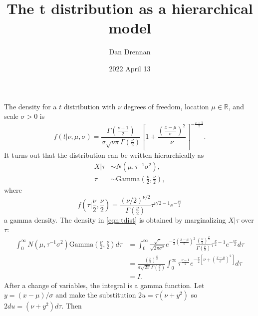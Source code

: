 \documentclass[11pt, letterpaper]{article}
\title{The t distribution as a hierarchical model}
\author{Dan Drennan}
\date{2022 April 13}
\begin{document}
    
\maketitle

The density for a $t$ distribution with $\nu$ degrees of freedom,
location $\mu \in \mathbb{R}$, and scale $\sigma > 0$ is
\begin{equation}
    f(t | \nu, \mu, \sigma) =
    \frac{\Gamma(\frac{\nu + 1}{2})}{\sigma\sqrt{\nu\pi}\Gamma(\frac{\nu}{2})}\left[
        1 + \frac{\left(\frac{x - \mu}{\sigma}\right)^2}{\nu}
    \right]^{-\frac{\nu + 1}{2}}.
    \label{eqn:tdist}
\end{equation}
It turns out that the distribution can be written hierarchically as
\begin{align*}
    X | \tau &\sim N(\mu, \tau^{-1}\sigma^2), \\
    \tau &\sim \text{Gamma}\left(\frac{\nu}{2}, \frac{\nu}{2}\right),
\end{align*}
where
$$
    f(\tau | \frac{\nu}{2}, \frac{\nu}{2}) = 
    \frac{(\nu/2)^{\nu/2}}{\Gamma(\frac{\nu}{2})} \tau^{\nu/2 - 1} e^{-\frac{\nu\tau}{2}}
$$
a gamma density. The density in \eqref{eqn:tdist} is obtained by marginalizing 
$X | \tau$ over $\tau$:
\begin{align*}
    \int_{0}^{\infty} N(\mu, \tau^{-1}\sigma^2) \text{Gamma}\left(\frac{\nu}{2}, \frac{\nu}{2}\right) d\tau
    &= 
        \int_{0}^{\infty} \frac{\sqrt{\tau}}{\sqrt{2\pi\sigma^2}}
        e^{-\frac{\tau}{2}\left(\frac{x - \mu}{\sigma}\right)^2}
        \frac{(\frac{\nu}{2})^{\frac{\nu}{2}}}{\Gamma(\frac{\nu}{2})} 
        \tau^{\frac{\nu}{2} - 1} e^{-\frac{\nu\tau}{2}} d\tau \\
    &=
        \frac{(\frac{\nu}{2})^{\frac{\nu}{2}}}{\sigma\sqrt{2\pi}\Gamma(\frac{\nu}{2})} \int_{0}^{\infty}
        \tau^{\frac{\nu-1}{2}} e^{-\frac{\tau}{2}\left[
            \nu + \left(\frac{x - \mu}{\sigma}\right)^2
        \right]} d\tau \\
    &= I.
\end{align*}
After a change of variables, the integral is a gamma function. Let $y = (x - \mu) / \sigma$ and make the
substitution $2u = \tau(\nu + y^2)$ so $2du = (\nu + y^2)d\tau$. Then
\end{document}
